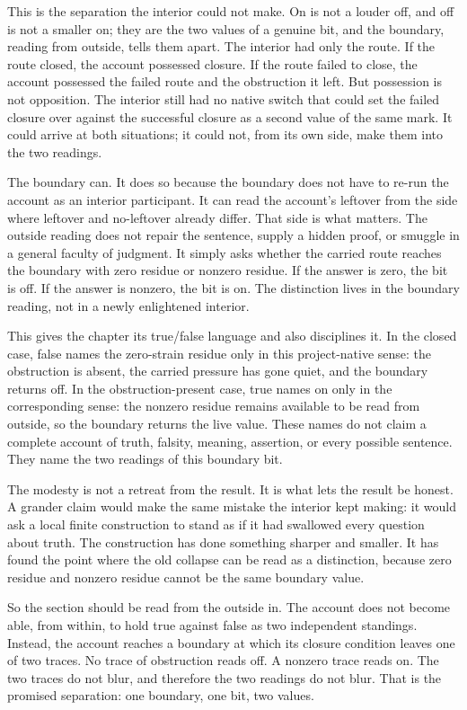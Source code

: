 This is the separation the interior could not make. On is not a louder off, and
off is not a smaller on; they are the two values of a genuine bit, and the
boundary, reading from outside, tells them apart. The interior had only the
route. If the route closed, the account possessed closure. If the route failed
to close, the account possessed the failed route and the obstruction it left.
But possession is not opposition. The interior still had no native switch that
could set the failed closure over against the successful closure as a second
value of the same mark. It could arrive at both situations; it could not, from
its own side, make them into the two readings.

The boundary can. It does so because the boundary does not have to re-run the
account as an interior participant. It can read the account's leftover from the
side where leftover and no-leftover already differ. That side is what matters.
The outside reading does not repair the sentence, supply a hidden proof, or
smuggle in a general faculty of judgment. It simply asks whether the carried
route reaches the boundary with zero residue or nonzero residue. If the
answer is zero, the bit is off. If the answer is nonzero, the bit is on. The
distinction lives in the boundary reading, not in a newly enlightened interior.

This gives the chapter its true/false language and also disciplines it. In the
closed case, false names the zero-strain residue only in this project-native
sense: the obstruction is absent, the carried pressure has gone quiet, and the
boundary returns off. In the obstruction-present case, true names on only in
the corresponding sense: the nonzero residue remains available to be read from
outside, so the boundary returns the live value. These names do not claim a
complete account of truth, falsity, meaning, assertion, or every possible
sentence. They name the two readings of this boundary bit.

The modesty is not a retreat from the result. It is what lets the result be
honest. A grander claim would make the same mistake the interior kept making:
it would ask a local finite construction to stand as if it had swallowed every
question about truth. The construction has done something sharper and smaller.
It has found the point where the old collapse can be read as a distinction,
because zero residue and nonzero residue cannot be the same boundary value.

So the section should be read from the outside in. The account does not become
able, from within, to hold true against false as two independent standings.
Instead, the account reaches a boundary at which its closure condition leaves
one of two traces. No trace of obstruction reads off. A nonzero trace reads on.
The two traces do not blur, and therefore the two readings do not blur. That is
the promised separation: one boundary, one bit, two values.

